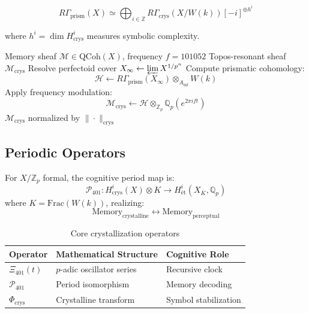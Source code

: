 \documentclass[12pt]{article}
\begin{document}
\begin{equation}
R\Gamma_{\text{prism}}(X) \simeq \bigoplus_{i\in\mathbb{Z}} R\Gamma_{\text{crys}}(X/W(k))[-i]^{\oplus h^i}
\end{equation}

where $h^i = \dim H^i_{\text{crys}}$ measures symbolic complexity.

\begin{algorithm}[H]
\caption{Prismatic Stack Construction}
\begin{algorithmic}[1]
\Require Memory sheaf $\mathcal{M}\in\text{QCoh}(X)$, frequency $f=101052$
\Ensure Topos-resonant sheaf $\mathcal{M}_{\text{crys}}$
\State Resolve perfectoid cover $X_\infty \gets \varprojlim X^{1/p^n}$
\State Compute prismatic cohomology:
\[
\mathcal{H} \gets R\Gamma_{\text{prism}}(X_\infty)\otimes_{A_{\text{inf}}}W(k)
\]
\State Apply frequency modulation:
\[
\mathcal{M}_{\text{crys}} \gets \mathcal{H}\otimes_{\mathbb{Z}_p}\mathbb{Q}_p(e^{2\pi i f t})
\]
\State \Return $\mathcal{M}_{\text{crys}}$ normalized by $\|\cdot\|_{\text{crys}}$
\end{algorithmic}
\end{algorithm}

\subsection{Periodic Operators}
\begin{definition}
For $X/\mathbb{Z}_p$ formal, the cognitive period map is:
\[
\mathcal{P}_{401}\colon H^i_{\text{crys}}(X)\otimes K \to H^i_{\text{\'et}}(X_{\overline{K}},\mathbb{Q}_p)
\]
where $K=\text{Frac}(W(k))$, realizing:
\[
\text{Memory}_{\text{crystalline}} \leftrightarrow \text{Memory}_{\text{perceptual}}
\]
\end{definition}

\begin{table}[h]
\centering
\begin{tabular}{lll}
\toprule
\textbf{Operator} & \textbf{Mathematical Structure} & \textbf{Cognitive Role} \\
\midrule
$\Xi_{401}(t)$ & $p$-adic oscillator series & Recursive clock \\
$\mathcal{P}_{401}$ & Period isomorphism & Memory decoding \\
$\Phi_{\text{crys}}$ & Crystalline transform & Symbol stabilization \\
\bottomrule
\end{tabular}
\caption{Core crystallization operators}
\end{table}
\end{document}

